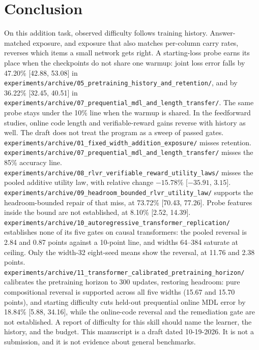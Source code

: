 \section{Conclusion}

On this addition task, observed difficulty follows training history.
Answer-matched exposure, and exposure that also matches per-column carry rates, reverses which items a small network gets right.
A starting-loss probe earns its place when the checkpoints do not share one warmup: joint loss error falls by 47.20\% [42.88, 53.08] in \texttt{experiments/archive/05\_pretraining\_history\_and\_retention/}, and by 36.22\% [32.45, 40.51] in \texttt{experiments/archive/07\_prequential\_mdl\_and\_length\_transfer/}.
The same probe stays under the 10\% line when the warmup is shared.
In the feedforward studies, online code length and verifiable-reward gains reverse with history as well.
The draft does not treat the program as a sweep of passed gates.
\texttt{experiments/archive/01\_fixed\_width\_addition\_exposure/} misses retention.
\texttt{experiments/archive/07\_prequential\_mdl\_and\_length\_transfer/} misses the 85\% accuracy line.
\texttt{experiments/archive/08\_rlvr\_verifiable\_reward\_utility\_laws/} misses the pooled additive utility law, with relative change $-15.78\%$ [$-35.91$, $3.15$].
\texttt{experiments/archive/09\_headroom\_bounded\_rlvr\_utility\_law/} supports the headroom-bounded repair of that miss, at 73.72\% [70.43, 77.26].
Probe features inside the bound are not established, at 8.10\% [2.52, 14.39].
\texttt{experiments/archive/10\_autoregressive\_transformer\_replication/} establishes none of its five gates on causal transformers: the pooled reversal is 2.84 and 0.87 points against a 10-point line, and widths 64--384 saturate at ceiling.
Only the width-32 eight-seed means show the reversal, at 11.76 and 2.38 points.
\texttt{experiments/archive/11\_transformer\_calibrated\_pretraining\_horizon/} calibrates the pretraining horizon to 300 updates, restoring headroom: pure compositional reversal is supported across all five widths (15.67 and 15.70 points), and starting difficulty cuts held-out prequential online MDL error by 18.84\% [5.88, 34.16], while the online-code reversal and the remediation gate are not established.
A report of difficulty for this skill should name the learner, the history, and the budget.
This manuscript is a draft dated 10-19-2026.
It is not a submission, and it is not evidence about general benchmarks.

